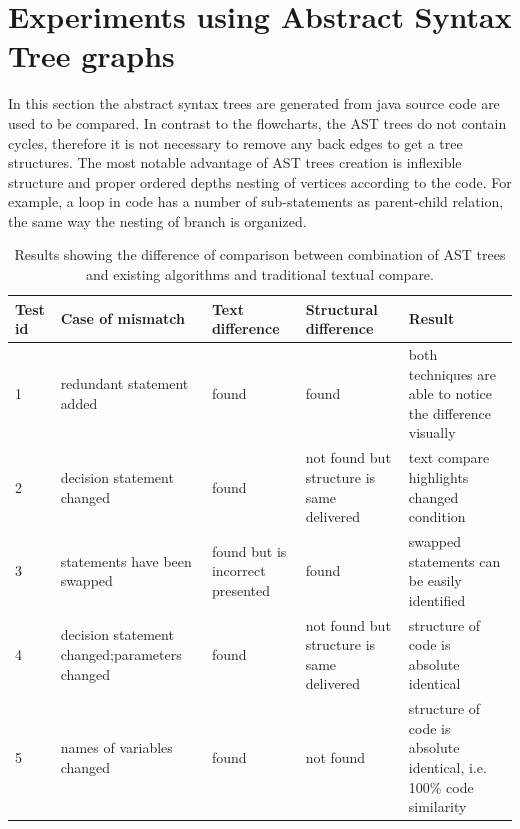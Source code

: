 \documentclass{report}
\begin{document}
\section{Experiments using Abstract Syntax Tree graphs}

In this section the abstract syntax trees are generated from java source code are used to be compared. In contrast to the flowcharts, the AST trees do not contain cycles, therefore it is not necessary to remove any back edges to get a tree structures. The most notable advantage of AST trees creation is inflexible structure and proper ordered depths nesting of vertices according to the code. For example, a loop in code has a number of sub-statements as parent-child relation, the same way the nesting of branch is organized.

\begin{table}[h]

\begin{tabular}{|p{0.5cm}|p{3cm}|p{2cm}|p{3cm}|p{5cm}|}
\hline
\rowcolor[HTML]{C0C0C0} 
Test id & Case of mismatch                                           & Text difference                  & Structural difference                           & Result \\ \hline
1       & redundant statement added                      & found                            & found                                    & both techniques are able to notice the difference visually \\ \hline
2       & decision statement changed                     & found                            & not found but structure is same delivered & text compare highlights changed condition   \\ \hline
3       & statements have been swapped                   & found but is incorrect presented & found                                    & swapped statements can be easily identified \\ \hline
4       & decision statement changed;\newline parameters changed & found                            & not found but structure is same delivered                                & structure of code is absolute identical\\ \hline
5       & names of variables changed                     & found                            & not found                                &                                             structure of code is absolute identical, i.e. 100\% code similarity \\ \hline
\end{tabular}
\caption[Summary of comparison between textual and structural compare with AST]{Results showing the difference of comparison between combination of AST trees and existing algorithms and traditional textual compare. }
\label{table:ast_res}
\end{table}
\end{document}
